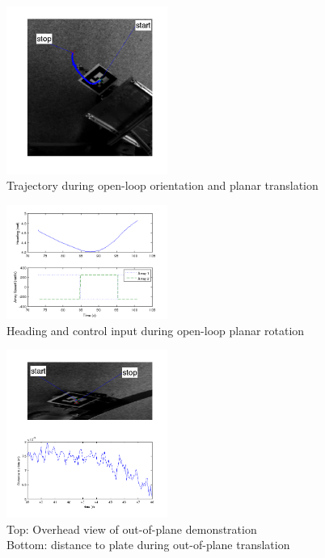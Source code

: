 \documentclass[letterpaper, 10 pt, conference]{ieeeconf}  %
\begin{document}
   \begin{figure}[thpb]
      \centering
      \includegraphics[width = 0.47\textwidth]{figures/driving_forward_trajectory.tif}
      \caption{Trajectory during open-loop orientation and planar translation}
      \label{fig:planartranslationtrajectory}
   \end{figure}
   
      \begin{figure}[thpb]
      \centering
      \includegraphics[width = 0.47\textwidth]{figures/planar_rotation.tif}
      \caption{Heading and control input during open-loop planar rotation}
      \label{fig:planartranslationtrajectory}
   \end{figure}
   
         \begin{figure}[thpb]
      \centering
      \includegraphics[width = 0.47\textwidth]{figures/distance_to_plate_w_pic_pull.tif}
      \caption{Top: Overhead view of out-of-plane demonstration \\ Bottom: distance to plate during out-of-plane translation}
      \label{fig:ooptranslation}
   \end{figure}
   
\end{document}
